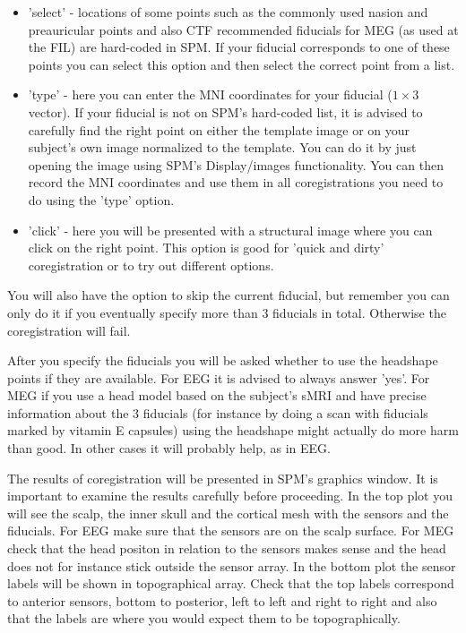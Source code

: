 \begin{itemize}
\item 'select' - locations of some points such as the commonly used nasion and preauricular points and also
CTF recommended fiducials for MEG (as used at the FIL) are hard-coded in SPM. If your fiducial corresponds to one of these
points you can select this option and then select the correct point from a list.
\item 'type' - here you can enter the MNI coordinates for your fiducial ($1 \times 3$ vector). If your fiducial is not
on SPM's hard-coded list, it is advised to carefully find the right point on either the template image or
on your subject's own image normalized to the template. You can do it by just opening the image using SPM's
Display/images functionality. You can then record the MNI coordinates and use them in all coregistrations you
need to do using the 'type' option.
\item 'click' - here you will be presented with a structural image where you can click on the right point.
This option is good for 'quick and dirty' coregistration or to try out different options.
\end{itemize}

You will also have the option to skip the current fiducial, but remember you can only do it if you eventually
specify more than 3 fiducials in total. Otherwise the coregistration will fail.

After you specify the fiducials you will be asked whether to use the headshape points if they are available.
For EEG it is advised to always answer 'yes'. For MEG if you use a head model based on the subject's sMRI and have
precise information about the 3 fiducials (for instance by doing a scan with fiducials marked by vitamin E capsules)
using the headshape might actually do more harm than good. In other cases it will probably help, as in EEG.

The results of coregistration will be presented in SPM's graphics window. It is important to examine the results
carefully before proceeding. In the top plot you will see the scalp, the inner skull and the cortical mesh
with the sensors and the fiducials. For EEG make sure that the sensors are on the scalp surface. For MEG check
that the head positon in relation to the sensors makes sense and the head does not for instance stick outside
the sensor array. In the bottom plot the sensor labels will be shown in topographical array. Check that the top
labels correspond to anterior sensors, bottom to posterior, left to left and right to right and also that the labels
are where you would expect them to be topographically.

